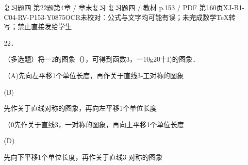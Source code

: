 \begin{bankitem}{复习题四 第22题}{第4章 / 章末复习 复习题四 / 教材 p.153 / PDF 第160页}{XJ-B1-C04-RV-P153-Y0875}{OCR未校对：公式与文字均可能有误；未完成数学TeX转写；禁止直接发给学生}
\begin{ocrdraft}
\par
22．
\par
（多选题）将一2的图象（），可得到函数3，一10g20十I)的图象．
\par
（A)先向左平移1个单位长度，再作关于直线3-工对称的图象
\par
(B)
\par
先作关于直线对称的图象，再向左平移1个单位长度
\par
（0先作关于直线3，一对称的图象，再向上平移1个单位长度
\par
(D)
\par
先向下平移1个单位长度，再作关于直线3-对称的图象
\end{ocrdraft}
\end{bankitem}
